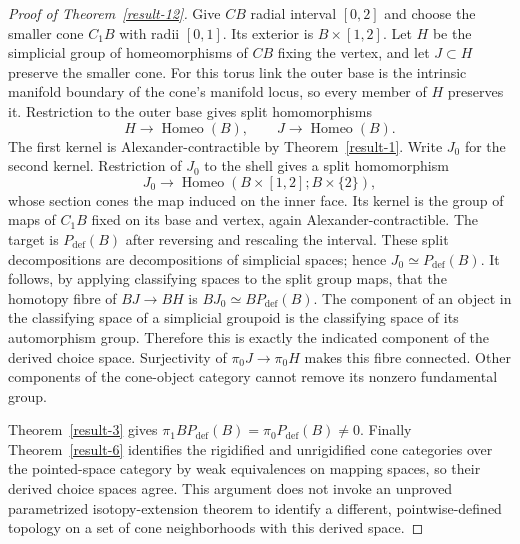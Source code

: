 \documentclass[11pt,a4paper]{article}
\theoremstyle{definition}
\DeclareMathOperator{\Homeo}{Homeo}
\begin{document}
\begin{proof}[Proof of Theorem~\ref{result-12}]
Give $CB$ radial interval $[0,2]$ and choose the smaller cone
$C_1B$ with radii $[0,1]$. Its exterior is $B\times[1,2]$.
Let $H$ be the simplicial group of homeomorphisms of $CB$ fixing
the vertex, and let $J\subset H$ preserve the smaller cone.
For this torus link the outer base is the intrinsic manifold boundary
of the cone's manifold locus, so every member of $H$ preserves it.
Restriction to the outer base gives split homomorphisms
\[
 H\longrightarrow\Homeo(B),\qquad
 J\longrightarrow\Homeo(B).
\]
The first kernel is Alexander-contractible by Theorem~\ref{result-1}. Write $J_0$
for the second kernel. Restriction of $J_0$ to the shell gives a
split homomorphism
\[
 J_0\longrightarrow
 \Homeo(B\times[1,2];B\times\{2\}),
\]
whose section cones the map induced on the inner face. Its kernel
is the group of maps of $C_1B$ fixed on its base and vertex, again
Alexander-contractible. The target is $P_{\mathrm{def}}(B)$ after
reversing and rescaling the interval. These split decompositions are
decompositions of simplicial spaces; hence $J_0\simeq P_{\mathrm{def}}(B)$.
It follows, by applying classifying spaces to the split group maps,
that the homotopy fibre of $BJ\to BH$ is $BJ_0\simeq BP_{\mathrm{def}}(B)$.
The component of an object in the classifying space of a simplicial
groupoid is the classifying space of its automorphism group. Therefore
this is exactly the indicated component of the derived choice space.
Surjectivity of $\pi_0J\to\pi_0H$ makes this fibre connected. Other
components of the cone-object category cannot remove its nonzero
fundamental group.

Theorem~\ref{result-3} gives $\pi_1BP_{\mathrm{def}}(B)=\pi_0P_{\mathrm{def}}(B)\ne0$.
Finally Theorem~\ref{result-6} identifies the rigidified and unrigidified cone categories
over the pointed-space category by weak equivalences on mapping spaces,
so their derived choice spaces agree. This argument does not invoke an
unproved parametrized isotopy-extension theorem to identify a different,
pointwise-defined topology on a set of cone neighborhoods with this
derived space.
\end{proof}
\end{document}
